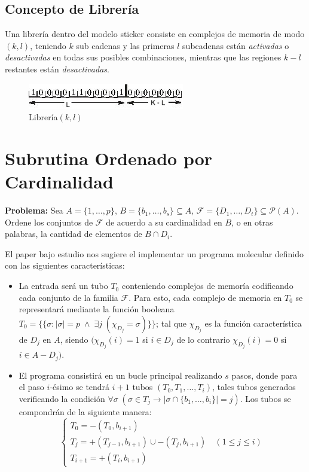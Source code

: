 \documentclass[12pt, letterpaper, twoside]{article}
\begin{document}
    \subsection{Concepto de Librería}
    Una librería dentro del modelo sticker consiste en complejos de memoria de modo $(k,l)$, teniendo $k$ sub cadenas y las primeras $l$ subcadenas están \emph{activadas} o \emph{desactivadas} en todas sus posibles combinaciones, mientras que las regiones $k -l$ restantes están \emph{desactivadas}\autocite{Taghipour2013}.

    \begin{figure}[h!]
        \centering
        \includegraphics[]{libreria.jpg}
        \caption{Librería$(k,l)$}
    \end{figure}

    \section{Subrutina Ordenado por Cardinalidad}
    \textbf{Problema:} Sea $A = \{1,\dots,p\}$, $B = \{b_1,\dots,b_s\} \subseteq A$, $\mathcal{F} = \{D_1,\dots,D_t\} \subseteq \mathcal{P}(A)$. Ordene los conjuntos de $\mathcal{F}$ de acuerdo a su cardinalidad en $B$, o en otras palabras, la cantidad de elementos de $B\cap D_i$.


    El paper bajo estudio nos sugiere el implementar un programa molecular definido con las siguientes características:
    \begin{itemize}
        \item  La entrada será un tubo $T_0$ conteniendo complejos de memoría codificando cada conjunto de la familia $\mathcal{F}$. Para esto, cada complejo de memoria en $T_0$ se representará mediante la función booleana  $T_0=\{\{\sigma:|\sigma|=p\;\land\;\exists{j}\;(\chi_{D_j}=\sigma)\}\}$; tal que $\chi_{D_j}$ es la función característica de $D_j$ en $A$, siendo $(\chi_{D_j}(i) = 1$ si $i \in D_j$ de lo contrario $\chi_{D_j}(i) = 0$ si $i \in A - D_j)$.
        \item  El programa consistirá en un bucle principal realizando $s$ pasos, donde para el paso $i$-ésimo se tendrá $i+1$ tubos $(T_0, T_1,\dots,T_i)$, tales tubos generados verificando la condición $\forall\sigma\;(\sigma\in T_j \rightarrow|\sigma\cap\{b_1,\dots,b_i\}|=j)$. Los tubos se compondrán de la siguiente manera:
        \begin{equation*}
            \begin{cases}
                T_0=-(T_0,b_{i+1}) \\
                T_j=+(T_{j-1}, b_{i+1}) \cup -(T_j, b_{i+1}) \quad (1\leq{j}\leq{i}) \\
                T_{i+1} = +(T_i,b_{i+1})
            \end{cases}
        \end{equation*}
    \end{itemize}
\end{document}
